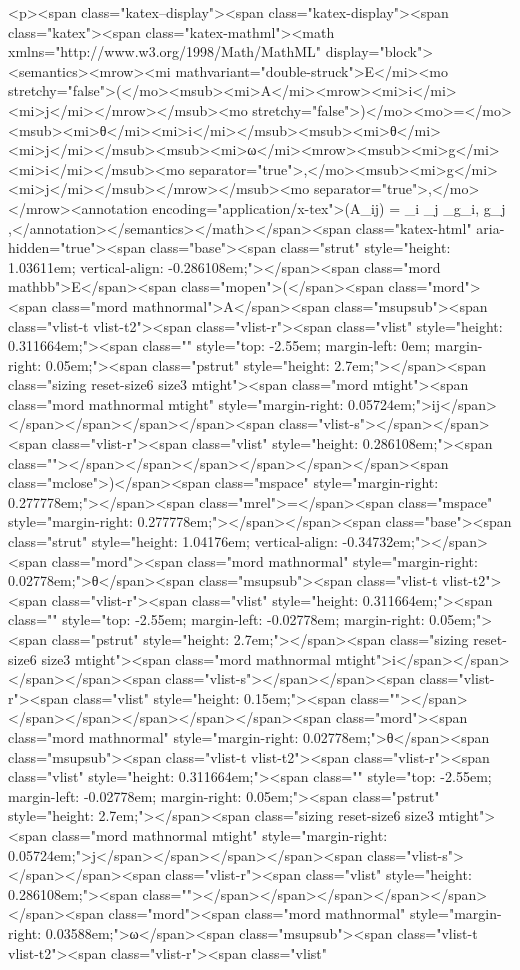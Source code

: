 <p><span class="katex--display"><span class="katex-display"><span class="katex"><span class="katex-mathml"><math xmlns="http://www.w3.org/1998/Math/MathML" display="block"><semantics><mrow><mi mathvariant="double-struck">E</mi><mo stretchy="false">(</mo><msub><mi>A</mi><mrow><mi>i</mi><mi>j</mi></mrow></msub><mo stretchy="false">)</mo><mo>=</mo><msub><mi>θ</mi><mi>i</mi></msub><msub><mi>θ</mi><mi>j</mi></msub><msub><mi>ω</mi><mrow><msub><mi>g</mi><mi>i</mi></msub><mo separator="true">,</mo><msub><mi>g</mi><mi>j</mi></msub></mrow></msub><mo separator="true">,</mo></mrow><annotation encoding="application/x-tex">(A_{ij}) = \theta_i \theta_j \omega_{g_i, g_j} ,</annotation></semantics></math></span><span class="katex-html" aria-hidden="true"><span class="base"><span class="strut" style="height: 1.03611em; vertical-align: -0.286108em;"></span><span class="mord mathbb">E</span><span class="mopen">(</span><span class="mord"><span class="mord mathnormal">A</span><span class="msupsub"><span class="vlist-t vlist-t2"><span class="vlist-r"><span class="vlist" style="height: 0.311664em;"><span class="" style="top: -2.55em; margin-left: 0em; margin-right: 0.05em;"><span class="pstrut" style="height: 2.7em;"></span><span class="sizing reset-size6 size3 mtight"><span class="mord mtight"><span class="mord mathnormal mtight" style="margin-right: 0.05724em;">ij</span></span></span></span></span><span class="vlist-s">​</span></span><span class="vlist-r"><span class="vlist" style="height: 0.286108em;"><span class=""></span></span></span></span></span></span><span class="mclose">)</span><span class="mspace" style="margin-right: 0.277778em;"></span><span class="mrel">=</span><span class="mspace" style="margin-right: 0.277778em;"></span></span><span class="base"><span class="strut" style="height: 1.04176em; vertical-align: -0.34732em;"></span><span class="mord"><span class="mord mathnormal" style="margin-right: 0.02778em;">θ</span><span class="msupsub"><span class="vlist-t vlist-t2"><span class="vlist-r"><span class="vlist" style="height: 0.311664em;"><span class="" style="top: -2.55em; margin-left: -0.02778em; margin-right: 0.05em;"><span class="pstrut" style="height: 2.7em;"></span><span class="sizing reset-size6 size3 mtight"><span class="mord mathnormal mtight">i</span></span></span></span><span class="vlist-s">​</span></span><span class="vlist-r"><span class="vlist" style="height: 0.15em;"><span class=""></span></span></span></span></span></span><span class="mord"><span class="mord mathnormal" style="margin-right: 0.02778em;">θ</span><span class="msupsub"><span class="vlist-t vlist-t2"><span class="vlist-r"><span class="vlist" style="height: 0.311664em;"><span class="" style="top: -2.55em; margin-left: -0.02778em; margin-right: 0.05em;"><span class="pstrut" style="height: 2.7em;"></span><span class="sizing reset-size6 size3 mtight"><span class="mord mathnormal mtight" style="margin-right: 0.05724em;">j</span></span></span></span><span class="vlist-s">​</span></span><span class="vlist-r"><span class="vlist" style="height: 0.286108em;"><span class=""></span></span></span></span></span></span><span class="mord"><span class="mord mathnormal" style="margin-right: 0.03588em;">ω</span><span class="msupsub"><span class="vlist-t vlist-t2"><span class="vlist-r"><span class="vlist" 